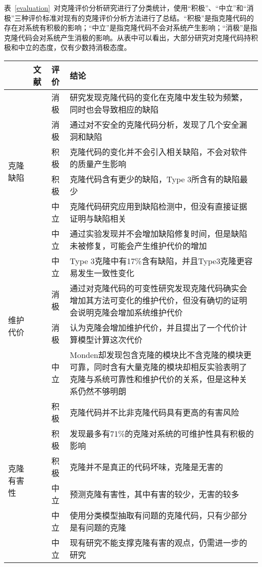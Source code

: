表~\ref{evaluation}~对克隆评价分析研究进行了分类统计，使用“积极”、“中立”和“消极”三种评价标准对现有的克隆评价分析方法进行了总结。“积极”是指克隆代码的存在对系统有积极的影响；“中立”是指克隆代码不会对系统产生影响；“消极”是指克隆代码会对系统产生消极的影响。从表中可以看出，大部分研究对克隆代码持积极和中立的态度，仅有少数持消极态度。

\begin{table}[htbp]
\centering
{}\vspace{0.5em}\wuhao
\begin{tabularx}{0.9\textwidth}{lllX}
\toprule[1.5pt]
&文献&评价&结论\\
\midrule[1pt]
\multirow{6}{*}{{克隆缺陷}} 
&\cite{juergens2009code}&消极&研究发现克隆代码的变化在克隆中发生较为频繁，同时也会导致相应的缺陷\\
&\cite{gauthier2013uncovering}&消极&通过对不安全的克隆代码分析，发现了几个安全漏洞和缺陷\\
&\cite{bettenburg2009empirical}&积极&克隆代码的变化并不会引入相关缺陷，不会对软件的质量产生影响\\
&\cite{elish2015fault}&积极&克隆代码含有更少的缺陷，Type 3所含有的缺陷最少\\
&\cite{lo2012active}&中立&克隆代码研究应用到缺陷检测中，但没有直接证据证明与缺陷相关\\
&\cite{kamei2011empirical}&中立	&通过实验发现并不会增加缺陷修复时间，但是缺陷未被修复，可能会产生维护代价的增加\\
\midrule[1pt]
\multirow{4}{*}{{维护代价}} 
&\cite{wagner2016relationship}&中立	&Type 3克隆中有17\%含有缺陷，并且Type3克隆更容易发生一致性变化\\
&\cite{harder2012controlled}&消极&通过对克隆代码的可变性研究发现克隆代码确实会增加其方法可变化的维护代价，但没有确切的证明会说明克隆会增加系统维护代价\\
&\cite{juergens2010much}&消极&认为克隆会增加维护代价，并且提出了一个代价计算模型计算这次代价\\
&\cite{monden2002software}&中立&Monden却发现包含克隆的模块比不含克隆的模块更可靠，同时含有大量克隆的模块却相反实验表明了克隆与系统可靠性和维护代价的关系，但是这种关系仍然不够明朗\\
\midrule[1pt]
\multirow{6}{*}{{克隆有害性}} 
&\cite{selim2010studying}&积极&克隆代码并不比非克隆代码具有更高的有害风险\\
&\cite{kapser2006cloning}\cite{kapser2008cloning}&积极	&发现最多有71\%的克隆对系统的可维护性具有积极的影响\\
&\cite{rahman2012clones}&积极	&克隆并不是真正的代码坏味，克隆是无害的\\
&\cite{wang2012can}&中立	&预测克隆有害性，其中有害的较少，无害的较多\\
&\cite{higo2009problematic}&中立&使用分类模型抽取有问题的克隆代码，只有少部分是有问题的克隆\\
&\cite{hordijk2009harmfulness}&中立&现有研究不能支撑克隆有害的观点，仍需进一步的研究\\
\bottomrule[1.5pt]
\end{tabularx}
\end{table}

